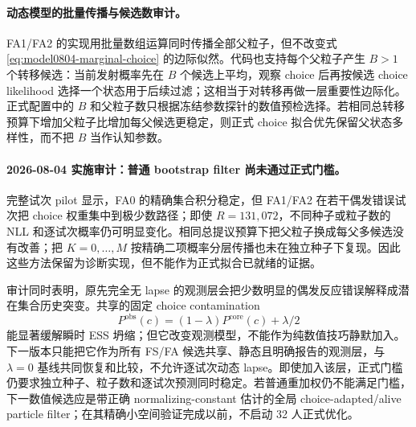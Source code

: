 \paragraph{动态模型的批量传播与候选数审计。}
FA1/FA2 的实现用批量数组运算同时传播全部父粒子，但不改变式 \ref{eq:model0804-marginal-choice} 的边际似然。代码也支持每个父粒子产生 $B>1$ 个转移候选：当前发射概率先在 $B$ 个候选上平均，观察 choice 后再按候选 choice likelihood 选择一个状态用于后续过滤；这相当于对转移再做一层重要性边际化。正式配置中的 $B$ 和父粒子数只根据冻结参数探针的数值预检选择。若相同总转移预算下增加父粒子比增加每父候选更稳定，则正式 choice 拟合优先保留父状态多样性，而不把 $B$ 当作认知参数。

\paragraph{2026-08-04 实施审计：普通 bootstrap filter 尚未通过正式门槛。}
完整试次 pilot 显示，FA0 的精确集合积分稳定，但 FA1/FA2 在若干偶发错误试次把 choice 权重集中到极少数路径；即使 $R=131{,}072$，不同种子或粒子数的 NLL 和逐试次概率仍可明显变化。相同总提议预算下把父粒子换成每父多候选没有改善；把 $K=0,\ldots,M$ 按精确二项概率分层传播也未在独立种子下复现。因此这些方法保留为诊断实现，但不能作为正式拟合已就绪的证据。

审计同时表明，原先完全无 lapse 的观测层会把少数明显的偶发反应错误解释成潜在集合历史突变。共享的固定 choice contamination
\begin{equation}
 P^{\mathrm{obs}}(c)=(1-\lambda)P^{\mathrm{core}}(c)+\lambda/2
\end{equation}
能显著缓解瞬时 ESS 坍缩；但它改变观测模型，不能作为纯数值技巧静默加入。下一版本只能把它作为所有 FS/FA 候选共享、静态且明确报告的观测层，与 $\lambda=0$ 基线共同恢复和比较，不允许逐试次动态 lapse。即使加入该层，正式门槛仍要求独立种子、粒子数和逐试次预测同时稳定。若普通重加权仍不能满足门槛，下一数值候选应是带正确 normalizing-constant 估计的全局 choice-adapted/alive particle filter；在其精确小空间验证完成以前，不启动 32 人正式优化。

